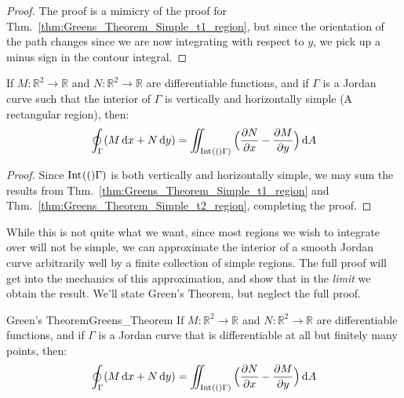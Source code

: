    \begin{proof}
        The proof is a mimicry of the proof for
        Thm.~\ref{thm:Greens_Theorem_Simple_t1_region},
        but since the orientation of the path changes
        since we are now integrating with respect to $y$,
        we pick up a minus sign in the contour integral.
    \end{proof}
    \begin{theorem}
        If $M:\mathbb{R}^{2}\rightarrow\mathbb{R}$ and
        $N:\mathbb{R}^{2}\rightarrow\mathbb{R}$ are
        differentiable functions, and if
        $\Gamma$ is a Jordan curve such that the
        interior of $\Gamma$ is vertically and horizontally
        simple (A rectangular region), then:
        \begin{equation}
            \oint_{\Gamma}(M\diff{x}+N\diff{y})=
            \iint_{\interior[](\Gamma)}\Big(
            \frac{\partial{N}}{\partial{x}}-
            \frac{\partial{M}}{\partial{y}}\Big)\diff{A}
        \end{equation}
    \end{theorem}
    \begin{proof}
        Since $\interior[](\Gamma)$ is both vertically and
        horizontally simple, we may sum the results from
        Thm.~\ref{thm:Greens_Theorem_Simple_t1_region}
        and
        Thm.~\ref{thm:Greens_Theorem_Simple_t2_region},
        completing the proof.
    \end{proof}
    While this is not quite what we want, since most
    regions we wish to integrate over will not be simple,
    we can approximate the interior of a smooth Jordan
    curve arbitrarily well by a finite collection of
    simple regions. The full proof will get into the
    mechanics of this approximation, and show that in
    the \textit{limit} we obtain the result. We'll state
    Green's Theorem, but neglect the full proof.
    \begin{ltheorem}{Green's Theorem}{Greens_Theorem}
        If $M:\mathbb{R}^{2}\rightarrow\mathbb{R}$ and
        $N:\mathbb{R}^{2}\rightarrow\mathbb{R}$ are
        differentiable functions, and if
        $\Gamma$ is a Jordan curve that is differentiable at
        all but finitely many points, then:
        \begin{equation}
            \oint_{\Gamma}(M\diff{x}+N\diff{y})=
            \iint_{\interior[](\Gamma)}\Big(
            \frac{\partial{N}}{\partial{x}}-
            \frac{\partial{M}}{\partial{y}}\Big)\diff{A}
        \end{equation}
    \end{ltheorem}
